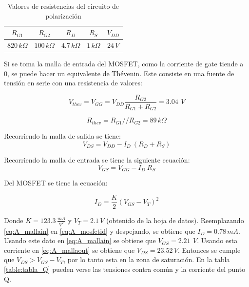 \documentclass[10pt,spanish,a4paper,notitlepage]{article}
\begin{document}
\begin{table}[H]
    \centering
    \begin{tabular}{|c|c|c|c|c|} %
    \hline
    $R_{G1}$ & $R_{G2}$ & $R_{D}$ & $R_{S}$ & $V_{DD}$  \\ \hline
    $820\,\unit{k\Omega}$ & $100\,\unit{k\Omega}$ & $4.7\,\unit{k\Omega}$  & $1\,\unit{k\Omega}$  & $24\,\unit{V}$    \\ \hline
    \end{tabular}
    \caption{Valores de resistencias del circuito de polarización}
    \label{table:A_polarizacion}
    \end{table}

Si se toma la malla de entrada del MOSFET, como la corriente de gate tiende a 0, se puede hacer un equivalente de Thévenin. Este consiste en una fuente de tensión en serie con una resistencia de valores:

\begin{equation}
    V_{thev}=V_{GG}=V_{DD}\frac{R_{G2}}{R_{G1}+R_{G2}}=3.04\,\unit{\ V}
    \label{eq:A_Vthev}
\end{equation}

\begin{equation}
    R_{thev}=R_{G1}//R_{G2}=89\,\unit{k\Omega}
    \label{eq:A_Rthev}
\end{equation}

Recorriendo la malla de salida se tiene:
\begin{equation}
    V_{DS}=V_{DD}-I_{D}\ (R_D + R_S)
    \label{eq:A_mallaout}
\end{equation}


Recorriendo la malla de entrada se tiene la siguiente ecuación:
\begin{equation}
    V_{GS}=V_{GG}-I_{D}\ R_S
    \label{eq:A_mallain}
\end{equation}

Del MOSFET se tiene la ecuación:

\begin{equation}
    I_{D}=\frac{K}{2} \left ( V_{GS}-V_T \right )^{2}
    \label{eq:A_mosfetid}
\end{equation}


Donde $K=123.3\,\unit{\frac{mA}{V^2}}$ y $V_T=2.1\,\unit{V}$ (obtenido de la hoja de datos). Reemplazando \ref{eq:A_mallain} en \ref{eq:A_mosfetid} y despejando, se obtiene que $I_D=0.78\,\unit{mA}$. Usando este dato en \ref{eq:A_mallain} se obtiene que $V_{GS}=2.21\,\unit{\ V}$. Usando esta corriente en \ref{eq:A_mallaout} se obtiene que $V_{DS}=23.52\,\unit{V}$. Entonces se cumple que $V_{DS} > V_{GS}-V_{T}$, por lo tanto esta en la zona de saturación. En la tabla \ref{table:tabla_Q} pueden verse las tensiones contra común y la corriente del punto Q.
\end{document}
